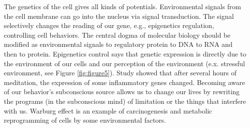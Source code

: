 \documentclass[jpm,article,submit,moreauthors,pdftex]{Definitions/mdpi}
\begin{document}
\begin{paracol}{2}
The genetics of the cell gives all kinds of potentials. %
Environmental signals from the cell membrane can go into the nucleus via signal transduction. The signal selectively changes the reading of our gene, e.g., epigenetics regulation, controlling cell behaviors.%
The central dogma of molecular biology should be modified as environmental signals to regulatory protein to DNA to RNA and then to protein.
Epigenetics control says that genetic expression is directly due to the environment of our cells and our perception of the environment\cite{Gustafson2017} (e.x. stressful environment, see Figure \ref{fig:figure5}).
Study showed that after several hours of meditation, the expression of some inflammatory genes changed\cite{Gustafson2017}.
Becoming aware of our behavior's subconscious source allows us to change our lives by rewriting the programs (in the subconscious mind) of limitation or the things that interfere with us.
Warburg effect\cite{Warburg1956}\cite{Chang2017b} is an example of carcinogenesis and metabolic reprogramming of cells by some environmental factors.

\end{paracol}
\end{document}
